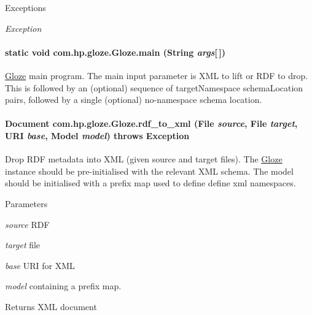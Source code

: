 \begin{DoxyExceptions}{Exceptions}
\item[{\em Exception}]\end{DoxyExceptions}
\hypertarget{classcom_1_1hp_1_1gloze_1_1_gloze_af78268830634f6069e1ab4733bb974d3}{
\paragraph[{main}]{\setlength{\rightskip}{0pt plus 5cm}static void com.hp.gloze.Gloze.main (String {\em args}\mbox{[}$\,$\mbox{]})}\hfill}
\label{classcom_1_1hp_1_1gloze_1_1_gloze_af78268830634f6069e1ab4733bb974d3}
\hyperlink{classcom_1_1hp_1_1gloze_1_1_gloze}{Gloze} main program. The main input parameter is XML to lift or RDF to drop. This is followed by an (optional) sequence of targetNamespace schemaLocation pairs, followed by a single (optional) no-\/namespace schema location. \hypertarget{classcom_1_1hp_1_1gloze_1_1_gloze_afb5f6d01b6ac4f73b37a7c38982b6244}{
\paragraph[{rdf\_\-to\_\-xml}]{\setlength{\rightskip}{0pt plus 5cm}Document com.hp.gloze.Gloze.rdf\_\-to\_\-xml (File {\em source}, \/  File {\em target}, \/  URI {\em base}, \/  Model {\em model})  throws Exception }\hfill}
\label{classcom_1_1hp_1_1gloze_1_1_gloze_afb5f6d01b6ac4f73b37a7c38982b6244}
Drop RDF metadata into XML (given source and target files). The \hyperlink{classcom_1_1hp_1_1gloze_1_1_gloze}{Gloze} instance should be pre-\/initialised with the relevant XML schema. The model should be initialised with a prefix map used to define define xml namespaces. 
\begin{DoxyParams}{Parameters}
\item[{\em source}]RDF \item[{\em target}]file \item[{\em base}]URI for XML \item[{\em model}]containing a prefix map. \end{DoxyParams}
\begin{DoxyReturn}{Returns}
XML document 
\end{DoxyReturn}
